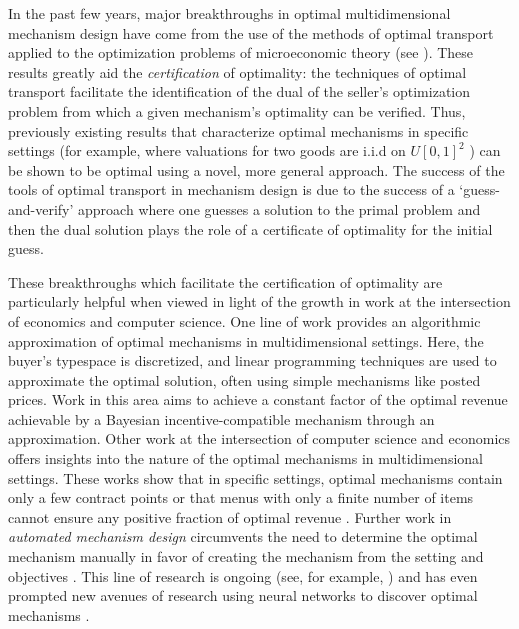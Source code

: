 In the past few years, major breakthroughs in optimal multidimensional mechanism design have come from the use of the methods of optimal transport applied to the optimization problems of microeconomic theory (see \cite{ekeland2010}). These results \autocite{daskalakis2017strong, kolesnikov2022} greatly aid the \textit{certification} of optimality: the techniques of optimal transport facilitate the identification of the dual of the seller's optimization problem from which a given mechanism's optimality can be verified. Thus, previously existing results that characterize optimal mechanisms in specific settings (for example, where valuations for two goods are i.i.d on $U[0,1]^2$ \autocite{pavlov2011optimal, manelli2006}) can be shown to be optimal using a novel, more general approach. The success of the tools of optimal transport in mechanism design is due to the success of a `guess-and-verify' approach where one guesses a solution to the primal problem and then the dual solution plays the role of a certificate of optimality for the initial guess.

These breakthroughs which facilitate the certification of optimality are particularly helpful when viewed in light of the growth in work at the intersection of economics and computer science. One line of work \autocite{chawla2007,cai2012,cai2016,belloni2010multidimensional,alaei2019efficient} provides an algorithmic approximation of optimal mechanisms in multidimensional settings. Here, the buyer's typespace is discretized, and linear programming techniques are used to approximate the optimal solution, often using simple mechanisms like posted prices. Work in this area aims to achieve a constant factor of the optimal revenue achievable by a Bayesian incentive-compatible mechanism through an approximation. Other work at the intersection of computer science and economics offers insights into the nature of the optimal mechanisms in multidimensional settings. These works show that in specific settings, optimal mechanisms contain only a few contract points \autocite{wang2014optimal} or that menus with only a finite number of items cannot ensure any positive fraction of optimal revenue \autocite{hart2019}. Further work in \textit{automated mechanism design} circumvents the need to determine the optimal mechanism manually in favor of creating the mechanism from the setting and objectives \autocite{conitzer2002,conitzer2004}. This line of research is ongoing (see, for example, \cite{conitzer2021}) and has even prompted new avenues of research using neural networks to discover optimal mechanisms \autocite{dutting2024}.

